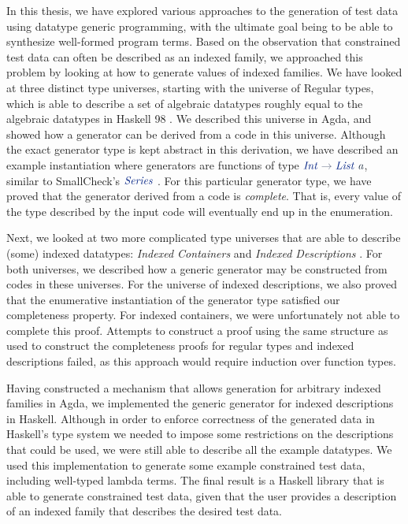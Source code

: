 \documentclass[a4paper,msc,twosized=semi]{uustthesis}
\let\oldemph\emph
\renewcommand\emph[1]{{\large\oldemph{#1}}}
\newcommand*{\mathcolor}{}
\def\mathcolor#1#{\mathcoloraux{#1}}
\newcommand*{\mathcoloraux}[3]{%
  \protect\leavevmode
  \begingroup
    \color#1{#2}#3%
  \endgroup
}
\newcommand{\HSSym}[1]{\mathcolor{hsblue4}{#1}}
\newcommand{\HSCon}[1]{\mathcolor{hsblue3}{\mathit{#1}}}
\newcommand{\HSVar}[1]{\mathcolor{hsblue5}{\mathit{#1}}}
\begin{document}
  In this thesis, we have explored various approaches to the generation of test data 
  using datatype generic programming, with the ultimate goal being to be able to 
  synthesize well-formed program terms. Based on the observation that constrained test 
  data can often be described as an indexed family, we approached this problem by 
  looking at how to generate values of indexed families. We have looked at three 
  distinct type universes, starting with the universe of Regular types, which is able 
  to describe a set of algebraic datatypes roughly equal to the algebraic datatypes in 
  Haskell 98 \cite{jones2003haskell}. We described this universe in Agda, and showed 
  how a generator can be derived from a code in this universe. Although the exact 
  generator type is kept abstract in this derivation, we have described an example 
  instantiation where generators are functions of type \ensuremath{\HSCon{Int}\HSSym{\to} \HSCon{List}\;\HSVar{a}}, similar to 
  SmallCheck's \ensuremath{\HSCon{Series}} \cite{runciman2008smallcheck}. For this particular generator 
  type, we have proved that the generator derived from a code is \emph{complete}. That 
  is, every value of the type described by the input code will eventually end up in 
  the enumeration. 

  Next, we looked at two more complicated type universes that are able to describe 
  (some) indexed datatypes: \emph{Indexed Containers} \cite{altenkirch2015indexed} and 
  \emph{Indexed Descriptions} \cite{dagand2013cosmology}. For both universes, we 
  described how a generic generator may be constructed from codes in these universes. 
  For the universe of indexed descriptions, we also proved that the enumerative 
  instantiation of the generator type satisfied our completeness property. For indexed 
  containers, we were unfortunately not able to complete this proof. Attempts to 
  construct a proof using the same structure as used to construct the completeness 
  proofs for regular types and indexed descriptions failed, as this approach would 
  require induction over function types. 

  Having constructed a mechanism that allows generation for arbitrary indexed families 
  in Agda, we implemented the generic generator for indexed descriptions in Haskell. 
  Although in order to enforce correctness of the generated data in Haskell's type 
  system we needed to impose some restrictions on the descriptions that could be used, 
  we were still able to describe all the example datatypes. We used this 
  implementation to generate some example constrained test data, including well-typed 
  lambda terms. The final result is a Haskell library that is able to generate 
  constrained test data, given that the user provides a description of an indexed 
  family that describes the desired test data. 
\end{document}
